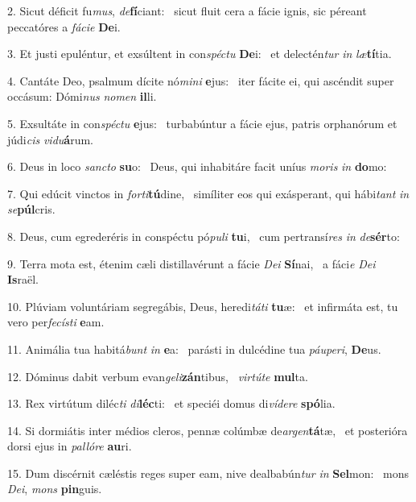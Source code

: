 2. Sicut déficit fu\textit{mus}, \textit{de}\textbf{fí}ciant: \ast\  sicut fluit cera a fácie ignis, sic péreant peccatóres a \textit{fá}\textit{ci}\textit{e} \textbf{De}i.\

3. Et justi epuléntur, et exsúltent in con\textit{spéc}\textit{tu} \textbf{De}i: \ast\  et delectén\textit{tur} \textit{in} \textit{læ}\textbf{tí}tia.\

4. Cantáte Deo, psalmum dícite nó\textit{mi}\textit{ni} \textbf{e}jus: \ast\  iter fácite ei, qui ascéndit super occásum: Dómi\textit{nus} \textit{no}\textit{men} \textbf{il}li.\

5. Exsultáte in con\textit{spéc}\textit{tu} \textbf{e}jus: \ast\  turbabúntur a fácie ejus, patris orphanórum et júdi\textit{cis} \textit{vi}\textit{du}\textbf{á}rum.\

6. Deus in loco \textit{sanc}\textit{to} \textbf{su}o: \ast\  Deus, qui inhabitáre facit uníus \textit{mo}\textit{ris} \textit{in} \textbf{do}mo:\

7. Qui edúcit vinctos in \textit{for}\textit{ti}\textbf{tú}dine, \ast\  simíliter eos qui exásperant, qui hábi\textit{tant} \textit{in} \textit{se}\textbf{púl}cris.\

8. Deus, cum egrederéris in conspéctu pó\textit{pu}\textit{li} \textbf{tu}i, \ast\  cum pertransí\textit{res} \textit{in} \textit{de}\textbf{sér}to:\

9. Terra mota est, étenim cæli distillavérunt a fácie \textit{De}\textit{i} \textbf{Sí}nai, \ast\  a fáci\textit{e} \textit{De}\textit{i} \textbf{Is}raël.\

10. Plúviam voluntáriam segregábis, Deus, heredi\textit{tá}\textit{ti} \textbf{tu}æ: \ast\  et infirmáta est, tu vero per\textit{fe}\textit{cís}\textit{ti} \textbf{e}am.\

11. Animália tua habitá\textit{bunt} \textit{in} \textbf{e}a: \ast\  parásti in dulcédine tua \textit{páu}\textit{pe}\textit{ri}, \textbf{De}us.\

12. Dóminus dabit verbum evan\textit{ge}\textit{li}\textbf{zán}tibus, \ast\  \textit{vir}\textit{tú}\textit{te} \textbf{mul}ta.\

13. Rex virtútum diléc\textit{ti} \textit{di}\textbf{léc}ti: \ast\  et speciéi domus di\textit{ví}\textit{de}\textit{re} \textbf{spó}lia.\

14. Si dormiátis inter médios cleros, pennæ colúmbæ de\textit{ar}\textit{gen}\textbf{tá}tæ, \ast\  et posterióra dorsi ejus in \textit{pal}\textit{ló}\textit{re} \textbf{au}ri.\

15. Dum discérnit cæléstis reges super eam, nive dealbabún\textit{tur} \textit{in} \textbf{Sel}mon: \ast\  mons \textit{De}\textit{i}, \textit{mons} \textbf{pin}guis.\

